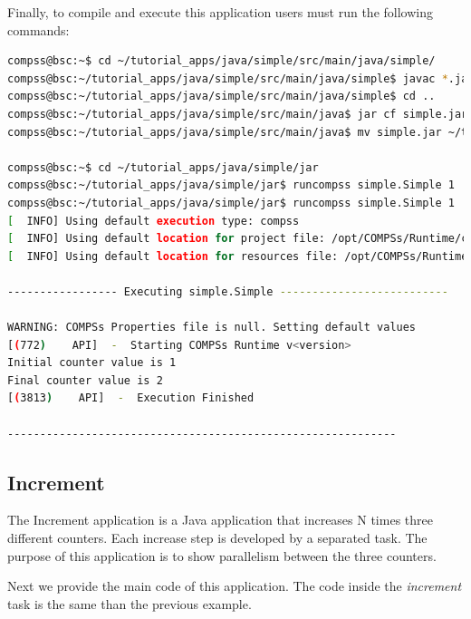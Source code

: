 Finally, to compile and execute this application users must run the following commands:

\begin{lstlisting}[language=bash]
compss@bsc:~$ cd ~/tutorial_apps/java/simple/src/main/java/simple/
compss@bsc:~/tutorial_apps/java/simple/src/main/java/simple$ javac *.java
compss@bsc:~/tutorial_apps/java/simple/src/main/java/simple$ cd ..
compss@bsc:~/tutorial_apps/java/simple/src/main/java$ jar cf simple.jar simple
compss@bsc:~/tutorial_apps/java/simple/src/main/java$ mv simple.jar ~/tutorial_apps/java/simple/jar/

compss@bsc:~$ cd ~/tutorial_apps/java/simple/jar
compss@bsc:~/tutorial_apps/java/simple/jar$ runcompss simple.Simple 1
compss@bsc:~/tutorial_apps/java/simple/jar$ runcompss simple.Simple 1
[  INFO] Using default execution type: compss
[  INFO] Using default location for project file: /opt/COMPSs/Runtime/configuration/xml/projects/default_project.xml
[  INFO] Using default location for resources file: /opt/COMPSs/Runtime/configuration/xml/resources/default_resources.xml

----------------- Executing simple.Simple --------------------------

WARNING: COMPSs Properties file is null. Setting default values
[(772)    API]  -  Starting COMPSs Runtime v<version>
Initial counter value is 1
Final counter value is 2
[(3813)    API]  -  Execution Finished

------------------------------------------------------------
\end{lstlisting}


\subsection{Increment}
The Increment application is a Java application that increases N times three different counters. Each increase step is developed by a separated task. The
purpose of this application is to show parallelism between the three counters.

Next we provide the main code of this application. The code inside the \textit{increment} task is the same than the previous example. 

